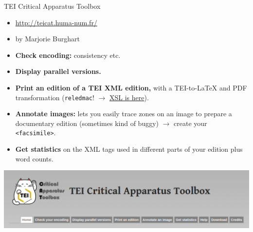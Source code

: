 
\begin{frame}{TEI Critical Apparatus Toolbox}

    \begin{itemize}\small 
        \item \protect\url{http://teicat.huma-num.fr/}
        \item by Marjorie Burghart
        \item \textbf{Check encoding:} consistency etc.
        \item \textbf{Display parallel versions.}
        \item \textbf{Print an edition of a TEI XML edition,} with a TEI-to-\LaTeX{} and PDF transformation (\texttt{reledmac}! $\to$ \href{https://github.com/MarjorieBurghart/TEI-CAT/blob/master/tei2latex_final.xslt}{XSL is here}).
        \item \textbf{Annotate images:} lets you easily trace zones on an image to prepare a documentary edition (sometimes kind of buggy) $\to$ create your \texttt{<facsimile>}.
        \item \textbf{Get statistics} on the XML tags used in different parts of your edition plus word counts.
    \end{itemize}
    
    \includegraphics[width=\textwidth]{img/tei-critical-app-toolbox.png}
\end{frame}



